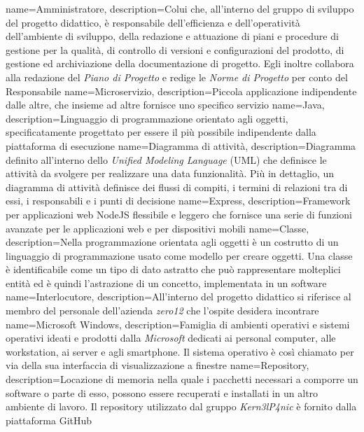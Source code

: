  {  
	name=Amministratore,   
	description={Colui che, all'interno del gruppo di sviluppo del progetto didattico, è responsabile dell'efficienza e dell'operatività dell'ambiente di sviluppo, della redazione e attuazione di piani e procedure di gestione per la qualità, di controllo di versioni e configurazioni del prodotto, di gestione ed archiviazione della documentazione di progetto. Egli inoltre collabora alla redazione del \textit{Piano di Progetto} e redige le \textit{Norme di Progetto} per conto del Responsabile}  
}
 {
	name=Microservizio,
	description={Piccola applicazione indipendente dalle altre, che insieme ad altre fornisce uno specifico servizio}
}
 {
	name=Java,
	description={Linguaggio di programmazione orientato agli oggetti, specificatamente progettato per essere il più possibile indipendente dalla piattaforma di esecuzione}
}
 {
	name=Diagramma di attività,
	description={Diagramma definito all'interno dello \textit{Unified Modeling Language} (UML) che definisce le attività da svolgere per realizzare una data funzionalità. Più in dettaglio, un diagramma di attività definisce dei flussi di compiti, i termini di relazioni tra di essi, i responsabili e i punti di decisione}
}
 {
	name=Express,
	description={Framework per applicazioni web NodeJS flessibile e leggero che fornisce una serie di funzioni avanzate per le applicazioni web e per dispositivi mobili}
}
 {
	name=Classe,
	description={Nella programmazione orientata agli oggetti è un costrutto di un linguaggio di programmazione usato come modello per creare oggetti. Una classe è identificabile come un tipo di dato astratto che può rappresentare molteplici entità ed è quindi l'astrazione di un concetto, implementata in un software}
}
 {
	name=Interlocutore,
	description={All'interno del progetto didattico si riferisce al membro del personale dell'azienda \textit{zero12} che l'ospite desidera incontrare}
}
 {
	name=Microsoft Windows,
	description={Famiglia di ambienti operativi e sistemi operativi ideati e prodotti dalla \textit{Microsoft} dedicati ai personal computer, alle workstation, ai server e agli smartphone. Il sistema operativo è così chiamato per via della sua interfaccia di visualizzazione a finestre}
}
 {
	name=Repository,
	description={Locazione di memoria nella quale i pacchetti necessari a comporre un software o parte di esso, possono essere recuperati e installati in un altro ambiente di lavoro. Il repository utilizzato dal gruppo \textit{Kern3lP4nic} è fornito dalla piattaforma GitHub}
}
